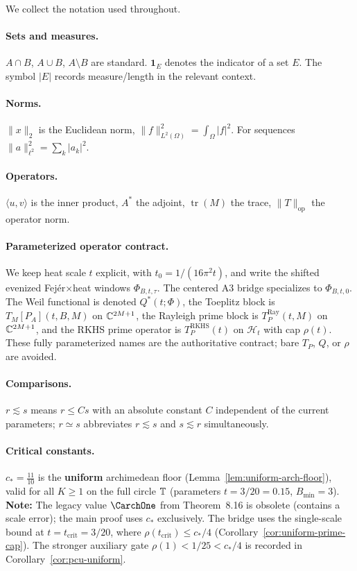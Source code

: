 We collect the notation used throughout.

\paragraph{Sets and measures.}
$A\cap B$, $A\cup B$, $A\setminus B$ are standard. $\mathbf{1}_E$ denotes the indicator of a set $E$.
The symbol $\lvert E\rvert$ records measure/length in the relevant context.

\paragraph{Norms.}
$\|x\|_2$ is the Euclidean norm, $\|f\|_{L^2(\Omega)}^2=\int_\Omega |f|^2$.
For sequences $\|a\|_{\ell^2}^2=\sum_k |a_k|^2$.

\paragraph{Operators.}
$\langle u,v\rangle$ is the inner product, $A^\ast$ the adjoint,
$\operatorname{tr}(M)$ the trace, $\|T\|_{\mathrm{op}}$ the operator norm.

\paragraph{Parameterized operator contract.}
We keep heat scale $t$ explicit, with $t_0=1/(16\pi^2 t)$, and write the shifted evenized Fej\'er$\times$heat windows
$\Phi_{B,t,\tau}$. The centered A3 bridge specializes to $\Phi_{B,t,0}$. The Weil functional is denoted $Q^\ast(t;\Phi)$, the Toeplitz block is
$T_M[P_A](t,B,M)$ on $\mathbb C^{2M+1}$, the Rayleigh prime block is $T_P^{\mathrm{Ray}}(t,M)$ on
$\mathbb C^{2M+1}$, and the RKHS prime operator is $T_P^{\mathrm{RKHS}}(t)$ on $\mathcal H_t$ with cap
$\rho(t)$. These fully parameterized names are the authoritative contract; bare $T_P$, $Q$, or $\rho$
are avoided.

\paragraph{Comparisons.}
$r\lesssim s$ means $r\le C s$ with an absolute constant $C$ independent of the current parameters; $r\simeq s$ abbreviates $r\lesssim s$ and $s\lesssim r$ simultaneously.

\paragraph{Critical constants.}
$c_* = \tfrac{11}{10}$ is the \textbf{uniform} archimedean floor (Lemma~\ref{lem:uniform-arch-floor}), valid for all $K\ge 1$ on the full circle $\mathbb T$ (parameters $t=3/20=0.15$, $B_{\min}=3$).
\textbf{Note:} The legacy value $\CarchOne$ from Theorem~8.16 is obsolete (contains a scale error); the main proof uses $c_*$ exclusively.
The bridge uses the single-scale bound at $t=t_{\mathrm{crit}}=3/20$, where
$\rho(t_{\mathrm{crit}})\le c_*/4$ (Corollary~\ref{cor:uniform-prime-cap}). The stronger auxiliary gate
$\rho(1)<1/25<c_*/4$ is recorded in Corollary~\ref{cor:pcu-uniform}.

